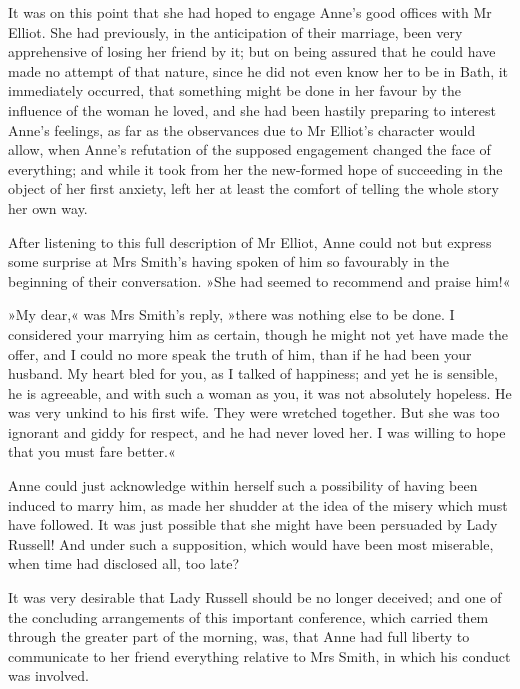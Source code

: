 It was on this point that she had hoped to engage Anne's good offices with Mr Elliot. She had previously, in the anticipation of their marriage, been very apprehensive of losing her friend by it; but on being assured that he could have made no attempt of that nature, since he did not even know her to be in Bath, it immediately occurred, that something might be done in her favour by the influence of the woman he loved, and she had been hastily preparing to interest Anne's feelings, as far as the observances due to Mr Elliot's character would allow, when Anne's refutation of the supposed engagement changed the face of everything; and while it took from her the new-formed hope of succeeding in the object of her first anxiety, left her at least the comfort of telling the whole story her own way.

After listening to this full description of Mr Elliot, Anne could not but express some surprise at Mrs Smith's having spoken of him so favourably in the beginning of their conversation. »She had seemed to recommend and praise him!«

»My dear,« was Mrs Smith's reply, »there was nothing else to be done. I considered your marrying him as certain, though he might not yet have made the offer, and I could no more speak the truth of him, than if he had been your husband. My heart bled for you, as I talked of happiness; and yet he is sensible, he is agreeable, and with such a woman as you, it was not absolutely hopeless. He was very unkind to his first wife. They were wretched together. But she was too ignorant and giddy for respect, and he had never loved her. I was willing to hope that you must fare better.«

Anne could just acknowledge within herself such a possibility of having been induced to marry him, as made her shudder at the idea of the misery which must have followed. It was just possible that she might have been persuaded by Lady Russell! And under such a supposition, which would have been most miserable, when time had disclosed all, too late?

It was very desirable that Lady Russell should be no longer deceived; and one of the concluding arrangements of this important conference, which carried them through the greater part of the morning, was, that Anne had full liberty to communicate to her friend everything relative to Mrs Smith, in which his conduct was involved.